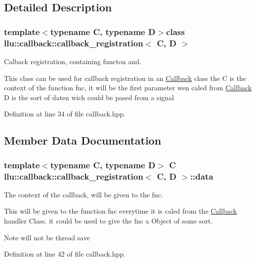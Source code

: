 \subsection{Detailed Description}
\subsubsection*{template$<$typename C, typename D$>$class llu\+::callback\+::callback\+\_\+registration$<$ C, D $>$}

Calback registration, containing functon and. 

This class can be used for callback registration in an \hyperlink{classllu_1_1callback_1_1_callback}{Callback} class the C is the context of the function fnc, it will be the first parameter wen caled from \hyperlink{classllu_1_1callback_1_1_callback}{Callback} D is the sort of daten wich could be pased from a signal 

Definition at line 34 of file callback.\+hpp.



\subsection{Member Data Documentation}
\hypertarget{classllu_1_1callback_1_1callback__registration_aecc9f23363c08b42144d70d928b4ec02}{
\subsubsection[{data}]{\setlength{\rightskip}{0pt plus 5cm}template$<$typename C, typename D$>$ C {\bf llu\+::callback\+::callback\+\_\+registration}$<$ C, D $>$\+::data}}\label{classllu_1_1callback_1_1callback__registration_aecc9f23363c08b42144d70d928b4ec02}


The context of the callback, will be given to the fnc. 

This will be given to the function fnc everytime it is caled from the \hyperlink{classllu_1_1callback_1_1_callback}{Callback} handler Class. it could be used to give the fnc a Object of some sort. \begin{DoxyNote}{Note}
will not be thread save 
\end{DoxyNote}


Definition at line 42 of file callback.\+hpp.

